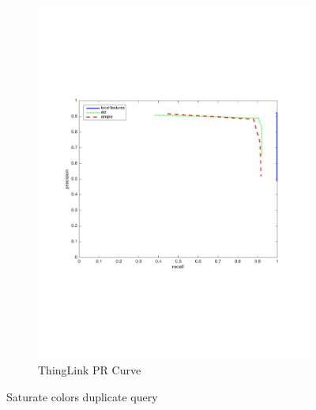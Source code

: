 \documentclass[english,12pt,a4paper,pdftex,elec,utf8, table]{aaltothesis}
\begin{document}
\begin{figure}[htb]
\begin{center}
\begin{subfigure}[b]{0.49\textwidth}
    \includegraphics[width=\textwidth]{figures/thinglink_SaturatecolorsPR.pdf}
    \caption{ThingLink PR Curve}
    \label{Saturateprthinglink}
  \end{subfigure}
  \caption{Saturate colors duplicate query}
  \end{center}
\end{figure}



\end{document}
